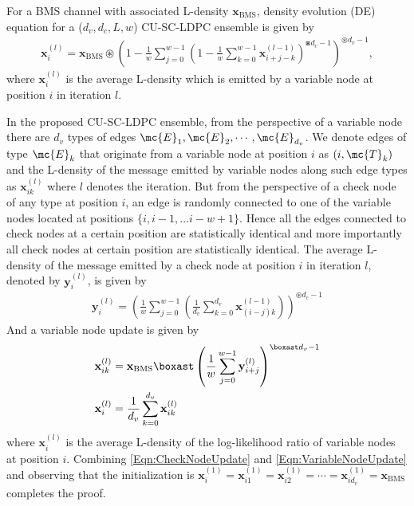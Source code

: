 \documentclass[journal]{IEEEtran}
\begin{document}
\begin{lemma}\label{Lemma:DE_SCLDPC}
For a BMS channel with associated L-density \cite{richardson2008modern} $\mathbf{x}_{\text{BMS}}$, density evolution (DE) equation for a ($d_{v},d_{c},L,w$) CU-SC-LDPC ensemble is given by
\begin{align}
\mathbf{x}_{i}^{(l)}=\mathbf{x}_{\text{BMS}}\circledast\left( 1-\frac{1}{w}\sum_{j=0}^{w-1}\left(1-\frac{1}{w}\sum_{k=0}^{w-1}\mathbf{x}_{i+j-k}^{(l-1)}\right)^{\boxast d_{c}-1} \right)^{\circledast d_{v}-1},
\label{Eqn:DE_SCLDPC}
\end{align}
where $\mathbf{x}_{i}^{(l)}$ is the average L-density which is emitted by a variable node at position $i$ in iteration $l$.
\end{lemma}
\begin{IEEEproof}
In the proposed CU-SC-LDPC ensemble, from the perspective of a variable node there are $d_{v}$ types of edges $\mc{E}_{1},\mc{E}_{2},\cdots,\mc{E}_{d_{v}}$. We denote edges of type $\mc{E}_{k}$ that originate from a variable node at position $i$ as $(i,\mc{T}_{k})$ and the L-density of the message emitted by variable nodes along such edge types as $\mathbf{x}_{ik}^{(l)}$ where $l$  denotes the iteration. But from the perspective of a check node of any type at position $i$, an edge is randomly connected to one of the variable nodes located at positions $\{i, i-1,... i-w+1\}$.	Hence all the edges connected to check nodes at a certain position are statistically identical and more importantly all check nodes at certain position are statistically identical. The average L-density of the message emitted by a check node at position $i$ in iteration $l$, denoted by $\mathbf{y}_{i}^{(l)}$, is given by
\begin{align}
\mathbf{y}_{i}^{(l)}=\left(\frac{1}{w}\sum_{j=0}^{w-1}\left(\frac{1}{d_{v}}\sum_{k=0}^{d_{v}}\mathbf{x}_{(i-j)k}^{(l-1)}\right)\right)^{\circledast d_{c}-1}
\label{Eqn:CheckNodeUpdate}
\end{align}
And a variable node update is given by
\begin{align}
\mathbf{x}_{ik}^{(l)}&=\mathbf{x}_{\text{BMS}}\boxast \left(\frac{1}{w}\sum_{j=0}^{w-1}\mathbf{y}_{i+j}^{(l)}\right)^{\boxast d_{v}-1}\label{Eqn:VariableNodeUpdate}\\
\mathbf{x}_{i}^{(l)}&=\frac{1}{d_{v}}\sum_{k=0}^{d_{v}}\mathbf{x}_{ik}^{(l)}\notag
\end{align}
where $\mathbf{x}_{i}^{(l)}$ is the average L-density of the log-likelihood ratio of variable nodes at position $i$.
Combining \eqref{Eqn:CheckNodeUpdate} and \eqref{Eqn:VariableNodeUpdate} and observing that the initialization
is $\mathbf{x}_{i}^{(1)}=\mathbf{x}_{i1}^{(1)}=\mathbf{x}_{i2}^{(1)}=\cdots=\mathbf{x}_{id_{v}}^{(1)}=\mathbf{x}_{\text{BMS}}$ completes the proof.
\end{IEEEproof}
\end{document}
